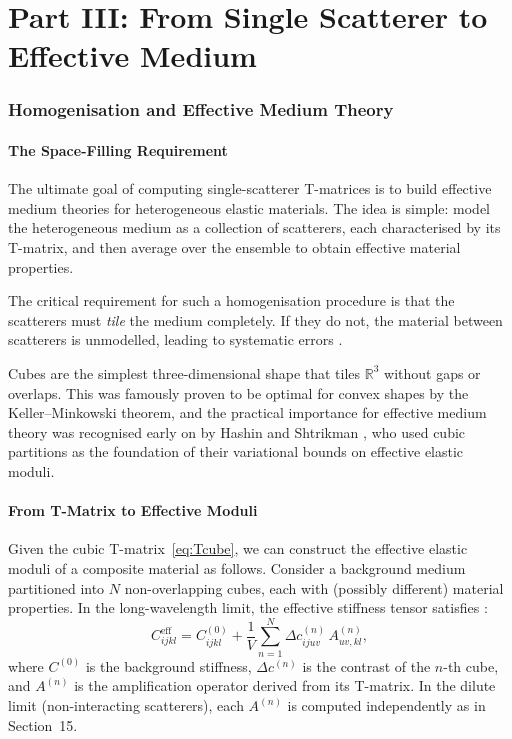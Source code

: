 
\part*{Part III: From Single Scatterer to Effective Medium}

\section{Homogenisation and Effective Medium Theory}

\subsection{The Space-Filling Requirement}

The ultimate goal of computing single-scatterer T-matrices is to build
effective medium theories for heterogeneous elastic materials.  The idea is
simple: model the heterogeneous medium as a collection of scatterers, each
characterised by its T-matrix, and then average over the ensemble to obtain
effective material properties.

The critical requirement for such a homogenisation procedure is that the
scatterers must \emph{tile} the medium completely.  If they do not, the
material between scatterers is unmodelled, leading to systematic
errors \citep{Willis1977,Hashin1983}.

Cubes are the simplest three-dimensional shape that tiles $\mathbb{R}^3$
without gaps or overlaps.  This was famously proven to be optimal for convex
shapes by the Keller--Minkowski theorem, and the practical importance for
effective medium theory was recognised early on by Hashin and
Shtrikman \citep{HashinShtrikman1962a,HashinShtrikman1962b,HashinShtrikman1963},
who used cubic partitions as the foundation of their variational bounds on
effective elastic moduli.

\subsection{From T-Matrix to Effective Moduli}

Given the cubic T-matrix~\eqref{eq:Tcube}, we can construct the effective
elastic moduli of a composite material as follows.  Consider a background
medium partitioned into $N$ non-overlapping cubes, each with (possibly
different) material properties.  In the long-wavelength limit, the
effective stiffness tensor satisfies \citep{ZellerDederichs1973,Willis1977}:
\begin{equation}
  C_{ijkl}^{\text{eff}} = C_{ijkl}^{(0)}
  + \frac{1}{V}\sum_{n=1}^{N}
    \Delta c_{ijuv}^{(n)}\,A_{uv,kl}^{(n)},
\label{eq:Ceff}
\end{equation}
where $C^{(0)}$ is the background stiffness, $\Delta c^{(n)}$ is the
contrast of the $n$-th cube, and $A^{(n)}$ is the amplification operator
derived from its T-matrix.  In the dilute limit (non-interacting
scatterers), each $A^{(n)}$ is computed independently as in Section~15.

